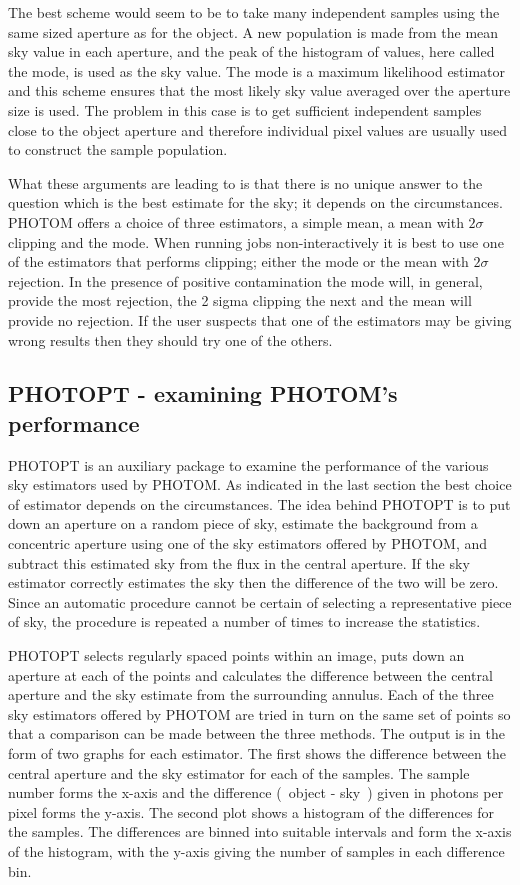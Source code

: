 The best scheme would seem to be to take many independent samples
using the same sized aperture as for the object. A new population is made
from the mean sky value in each aperture, and the peak of the histogram of
values, here called the mode, is used as the sky value. The mode is a
maximum likelihood estimator and this scheme ensures that the most likely
sky value averaged over the aperture size is used.
The problem in this case
is to get sufficient independent samples close to the object aperture and
therefore individual pixel values are usually used to construct the
sample population.

What these arguments are leading to is that there is no unique answer to
the question which is the best estimate for the sky; it depends on the
circumstances.
PHOTOM offers a choice of three estimators, a simple mean, a mean with
$2\sigma$ clipping and the mode.
When running jobs non-interactively it is best to use one of the estimators
that performs clipping; either the mode or the mean with $2\sigma$ rejection.
In the presence of positive contamination the mode will, in general,
provide the most rejection, the 2 sigma clipping the next and the mean
will provide no rejection. If the user suspects that one of the
estimators may be giving wrong results then they should try one of the
others.

\subsection{PHOTOPT - examining PHOTOM's performance}

PHOTOPT is an auxiliary package to examine the performance of the various
sky estimators used by PHOTOM. As indicated in the last section the
best choice of estimator depends on the circumstances.
The idea behind PHOTOPT is to put down an aperture on a random piece of sky,
estimate the background from a concentric aperture using one of the sky
estimators offered by PHOTOM, and subtract this estimated sky from the
flux in the central aperture. If the sky estimator correctly estimates
the sky then the difference of the two will be zero. Since an automatic
procedure cannot be certain of selecting a representative piece of sky,
the procedure is repeated a number of times to increase the statistics.

PHOTOPT selects regularly spaced points within an image, puts down an
aperture at each of the points and calculates the difference between
the central aperture and the sky estimate from the surrounding annulus.
Each of the three sky estimators offered by PHOTOM are tried in turn on
the same set of points so that a comparison can be made between the three
methods. The output is in the form of two graphs for each estimator. The
first shows the difference between the central aperture and the sky
estimator for each of the samples. The sample number forms the x-axis
and the difference (~object - sky~) given in photons per pixel forms
the y-axis. The second plot shows a histogram of the differences for
the samples. The differences are binned into suitable intervals and form
the x-axis of the histogram, with the y-axis giving the number of samples
in each difference bin.

